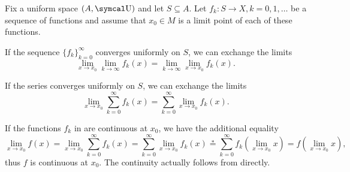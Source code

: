 \begin{theorem}\label{thm:uniform_limit_exchange}\cite[]{Фихтенгольц1968/2}
  Fix a uniform space \( (A, \CU) \) and let \( S \subseteq A \). Let \( f_k: S \to X, k = 0, 1, \ldots \) be a sequence of functions and assume that \( x_0 \in M \) is a limit point of each of these functions.

  \begin{thmenum}
     If the sequence \( \{ f_k \}_{k=0}^\infty \) converges uniformly on \( S \), we can exchange the limits
    \begin{equation*}
      \lim_{x \to x_0} \lim_{k \to \infty} f_k(x)
      =
      \lim_{k \to \infty} \lim_{x \to x_0} f_k(x).
    \end{equation*}

     If the series  converges uniformly on \( S \), we can exchange the limits
    \begin{equation*}
      \lim_{x \to x_0} \sum_{k=0}^\infty f_k(x)
      =
      \sum_{k=0}^\infty \lim_{x \to x_0} f_k(x).
    \end{equation*}
  \end{thmenum}
\end{theorem}

\begin{remark}\label{remark:thm:uniform_limit_exchange_continuity}
  If the functions \( f_k \) in  are continuous at \( x_0 \), we have the additional equality
  \begin{equation}\label{thm:uniform_limit_exchange/continuous_equality}
    \lim_{x \to x_0} f(x)
    =
    \lim_{x \to x_0} \sum_{k=0}^\infty f_k(x)
    =
    \sum_{k=0}^\infty \lim_{x \to x_0} f_k(x)
    \overset * =
    \sum_{k=0}^\infty f_k\left(\lim_{x \to x_0} x \right)
    =
    f\left(\lim_{x \to x_0} x \right),
  \end{equation}
  thus \( f \) is continuous at \( x_0 \). The continuity actually follows from  directly.
\end{remark}

